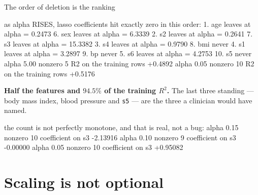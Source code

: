 \documentclass[aspectratio=169]{beamer}
\begin{document}
\begin{frame}[fragile,shrink=8]{The order of deletion is the ranking}
\begin{outblk}
as alpha RISES, lasso coefficients hit exactly zero in this order:
    1. age  leaves at alpha =  0.2473        6. sex  leaves at alpha =  6.3339
    2. s2   leaves at alpha =  0.2641        7. s3   leaves at alpha = 15.3382
    3. s4   leaves at alpha =  0.9790        8. bmi  never
    4. s1   leaves at alpha =  3.2897        9. bp   never
    5. s6   leaves at alpha =  4.2753       10. s5   never
   alpha   5.00   nonzero  5   R2 on the training rows +0.4892
   alpha   0.05   nonzero 10   R2 on the training rows +0.5176
\end{outblk}
\begin{center}\small
  \textbf{Half the features and $94.5\%$ of the training $R^2$.} The last
  three standing --- body mass index, blood pressure and \texttt{s5} --- are
  the three a clinician would have named.
\end{center}
\begin{outblk}
the count is not perfectly monotone, and that is real, not a bug:
   alpha  0.15  nonzero 10   coefficient on s3 -2.13916
   alpha  0.10  nonzero  9   coefficient on s3 -0.00000
   alpha  0.05  nonzero 10   coefficient on s3 +0.95082
\end{outblk}
\end{frame}

\section[Scaling]{Scaling is not optional}
\label{sec:scale}
\end{document}
